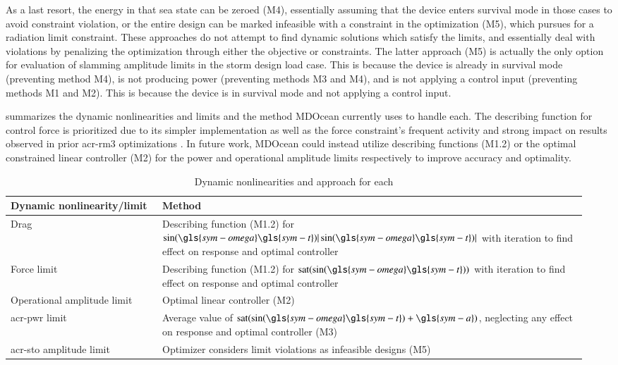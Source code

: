 As a last resort, the energy in that sea state can be zeroed (M4),
essentially assuming that the device enters survival mode in those cases to avoid constraint violation, or the entire design can be marked infeasible with a constraint in the optimization (M5), which \citet{mccabe_constrained_2013} pursues for a radiation limit constraint.
These approaches do not attempt to find dynamic solutions which satisfy the limits, and essentially deal with violations by penalizing the optimization through either the objective or constraints.
The latter approach (M5) is actually the only option for evaluation of slamming amplitude limits in the storm design load case.
\ifdefined\DISSERTATION
    This is because the device is already in survival mode (preventing method M4), is not producing power (preventing methods M3 and M4), and is not applying a control input (preventing methods M1 and M2).
\else
    This is because the device is in survival mode and not applying a control input.
\fi


 summarizes the dynamic nonlinearities and limits and the method MDOcean currently uses to handle each.
The describing function for control force is prioritized due to its simpler implementation as well as the force constraint's frequent activity and strong impact on results observed in prior \gls{acr-rm3} optimizations \citep{mccabe_multidisciplinary_2022,gaebele_tpl_2025,mcgilton_optimal_2024}.
\ifdefined\DISSERTATION
    In future work, MDOcean could instead utilize describing functions (M1.2) or the optimal constrained linear controller (M2) for the power and operational amplitude limits respectively to improve accuracy and optimality.
\fi

\begin{table}[htbp]
    \centering
    \caption{Dynamic nonlinearities and approach for each}
    \label{tab:nonlinearities}
\begin{tabular}{L{0.25\linewidth}L{0.7\linewidth}}
         \textbf{Dynamic nonlinearity/limit}& \parbox{\linewidth}{\centering\textbf{Method}}\\ \hline
         Drag& Describing function (M1.2) for $\sin(\gls{sym-omega} \gls{sym-t})|\sin(\gls{sym-omega} \gls{sym-t})|$ with iteration to find effect on response and optimal controller\\
         Force limit& Describing function (M1.2) for $\text{sat}(\sin(\gls{sym-omega} \gls{sym-t}))$ with iteration to find effect on response and optimal controller\\
        Operational amplitude limit& Optimal linear controller (M2)\\
         \gls{acr-pwr} limit& Average value of $\text{sat}(\sin(\gls{sym-omega} \gls{sym-t})+\gls{sym-a})$, neglecting any effect on response and optimal controller (M3)\\
        \gls{acr-sto} amplitude limit&Optimizer considers limit violations as infeasible designs (M5)\\
    \end{tabular}
    \end{table}

